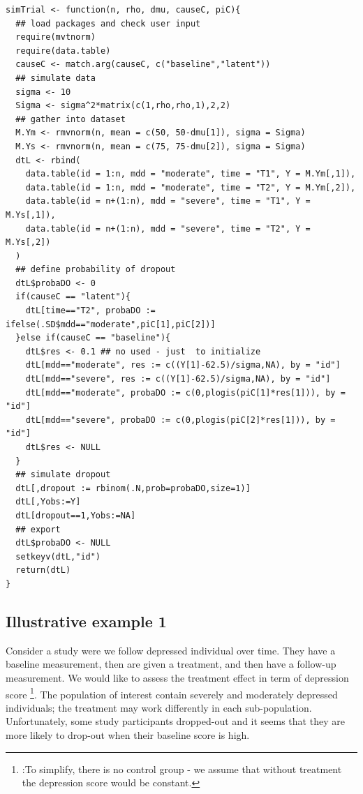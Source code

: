 \documentclass[12pt]{article}
\begin{document}
\clearpage

\lstset{language=r,label= ,caption= ,captionpos=b,numbers=none}
\begin{lstlisting}
simTrial <- function(n, rho, dmu, causeC, piC){
  ## load packages and check user input
  require(mvtnorm)
  require(data.table)
  causeC <- match.arg(causeC, c("baseline","latent"))
  ## simulate data
  sigma <- 10
  Sigma <- sigma^2*matrix(c(1,rho,rho,1),2,2)
  ## gather into dataset
  M.Ym <- rmvnorm(n, mean = c(50, 50-dmu[1]), sigma = Sigma)
  M.Ys <- rmvnorm(n, mean = c(75, 75-dmu[2]), sigma = Sigma)
  dtL <- rbind(
    data.table(id = 1:n, mdd = "moderate", time = "T1", Y = M.Ym[,1]),
    data.table(id = 1:n, mdd = "moderate", time = "T2", Y = M.Ym[,2]),
    data.table(id = n+(1:n), mdd = "severe", time = "T1", Y = M.Ys[,1]),
    data.table(id = n+(1:n), mdd = "severe", time = "T2", Y = M.Ys[,2])
  )
  ## define probability of dropout
  dtL$probaDO <- 0
  if(causeC == "latent"){
    dtL[time=="T2", probaDO := ifelse(.SD$mdd=="moderate",piC[1],piC[2])]
  }else if(causeC == "baseline"){
    dtL$res <- 0.1 ## no used - just  to initialize
    dtL[mdd=="moderate", res := c((Y[1]-62.5)/sigma,NA), by = "id"]
    dtL[mdd=="severe", res := c((Y[1]-62.5)/sigma,NA), by = "id"]
    dtL[mdd=="moderate", probaDO := c(0,plogis(piC[1]*res[1])), by = "id"]
    dtL[mdd=="severe", probaDO := c(0,plogis(piC[2]*res[1])), by = "id"]
    dtL$res <- NULL
  }
  ## simulate dropout
  dtL[,dropout := rbinom(.N,prob=probaDO,size=1)]
  dtL[,Yobs:=Y]
  dtL[dropout==1,Yobs:=NA]
  ## export
  dtL$probaDO <- NULL
  setkeyv(dtL,"id")
  return(dtL)
}
\end{lstlisting}

\clearpage

\subsection{Illustrative example 1}
\label{sec:org022e704}

Consider a study were we follow depressed individual over time. They
have a baseline measurement, then are given a treatment, and then have
a follow-up measurement. We would like to assess the treatment effect
in term of depression score \footnote{:To simplify, there is no control
group - we assume that without treatment the depression score would be
constant.}. The population of interest contain severely and moderately
depressed individuals; the treatment may work differently in each
sub-population. Unfortunately, some study participants dropped-out and
it seems that they are more likely to drop-out when their baseline
score is high.
\end{document}
